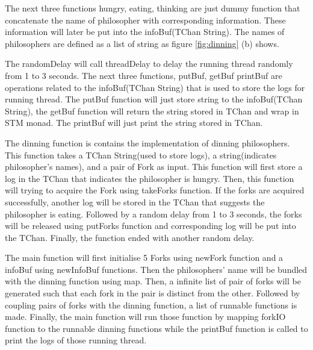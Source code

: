 \documentclass{article}
\begin{document}
\begin{normalsize}
  The next three functions hungry, eating, thinking are just dummy function that
  concatenate the name of philosopher with corresponding information. These
  information will later be put into the infoBuf(TChan String). The names of
  philosophers are defined as a list of string as figure \ref{fig:dinning} (b)
  shows.

  The randomDelay will call threadDelay to delay the running thread randomly
  from 1 to 3 seconds. The next three functions, putBuf, getBuf printBuf are
  operations related to the infoBuf(TChan String) that is used to store the logs
  for running thread. The putBuf function will just store string to the
  infoBuf(TChan String), the getBuf function will return the string stored in
  TChan and wrap in STM monad. The printBuf will just print the string stored in
  TChan.

  The dinning function is contains the implementation of dinning philosophers.
  This function takes a TChan String(used to store logs), a string(indicates
  philosopher's names), and a pair of Fork as input. This function will first
  store a log in the TChan that indicates the philosopher is hungry. Then, this
  function will trying to acquire the Fork using takeForks function. If the
  forks are acquired successfully, another log will be stored in the TChan that
  suggests the philosopher is eating. Followed by a random delay from 1 to 3
  seconds, the forks will be released using putForks function and corresponding
  log will be put into the TChan. Finally, the function ended with another
  random delay.

  The main function will first initialise 5 Forks using newFork function and a
  infoBuf using newInfoBuf functions. Then the philosophers' name will be
  bundled with the dinning function using map. Then, a infinite list of pair of
  forks will be generated such that each fork in the pair is distinct from the
  other. Followed by coupling pairs of forks with the dinning function, a list
  of runnable functions is made. Finally, the main function will run those
  function by mapping forkIO function to the runnable dinning functions while
  the printBuf function is called to print the logs of those running thread.

   \begin{figure}[H]


\end{figure}
\end{normalsize}
\end{document}

